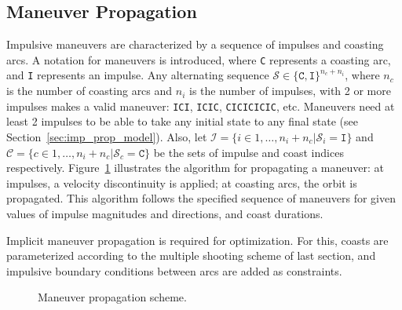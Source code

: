 \subsection{Maneuver Propagation}\label{sec:maneuver_propagation}

Impulsive maneuvers are characterized by a sequence of impulses and coasting arcs. A notation for maneuvers is introduced, where \texttt{C} represents a coasting arc, and \texttt{I} represents an impulse. Any alternating sequence \(\mathcal{S} \in \{\texttt{C}, \texttt{I}\}^{n_c + n_i}\), where \(n_c\) is the number of coasting arcs and \(n_i\) is the number of impulses, with 2 or more impulses makes a valid maneuver: \texttt{ICI}, \texttt{ICIC}, \texttt{CICICICIC}, etc. Maneuvers need at least 2 impulses to be able to take any initial state to any final state (see Section~\ref{sec:imp_prop_model}). Also, let \(\mathcal{I} = \{i \in 1,\dots,n_i+n_c | \mathcal{S}_i = \texttt{I}\}\) and \(\mathcal{C} = \{c \in 1,\dots,n_i+n_c | \mathcal{S}_c = \texttt{C}\}\) be the sets of impulse and coast indices respectively. Figure~\ref{fig:maneuver_propagation} illustrates the algorithm for propagating a maneuver: at impulses, a velocity discontinuity is applied; at coasting arcs, the orbit is propagated. This algorithm follows the specified sequence of maneuvers for given values of impulse magnitudes and directions, and coast durations. 

Implicit maneuver propagation is required for optimization. For this, coasts are parameterized according to the multiple shooting scheme of last section, and impulsive boundary conditions between arcs are added as constraints.  


\begin{figure}[htbp]
    \centering
    \caption{Maneuver propagation scheme.}
    \label{fig:maneuver_propagation}
\end{figure}

